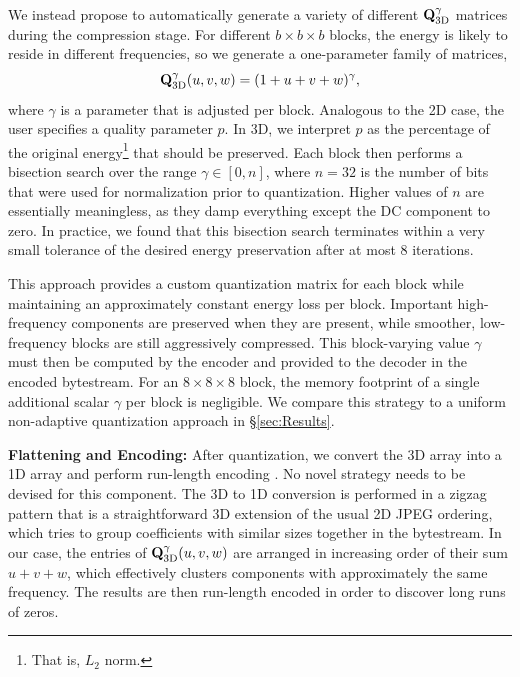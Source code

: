 We instead propose to automatically generate a variety of different $\mathbf{Q}^{\gamma}_{\textrm{3D}}$ matrices during the compression stage. For different $b \times b \times b$ blocks, the energy is likely to reside in different frequencies, so we generate a one-parameter family of matrices,
\begin{equation}
\mathbf{Q}^{\gamma}_{\textrm{3D}}(u,v,w) = (1 + u + v + w)^\gamma,
\end{equation}
where $\gamma$ is a parameter that is adjusted per block. 
Analogous to the 2D case, the user specifies a quality parameter $p$. In 3D, we interpret $p$ as the percentage of the original energy\footnote{That is, $L_2$ norm.} that should be preserved. Each block then performs a bisection search over the range $\gamma \in [0, n]$, where $n = 32$ is the number of bits that were used for normalization prior to quantization. Higher values of $n$ are essentially meaningless, as they damp everything except the DC component to zero. In practice, we found that this bisection search terminates within a very small tolerance of the desired energy preservation after at most $8$ iterations.

This approach provides a custom quantization matrix for each block while maintaining an approximately constant energy loss per block. Important high-frequency components are preserved when they are present, while smoother, low-frequency blocks are still aggressively compressed. This block-varying value $\gamma$ must then be computed by the encoder and provided to the decoder in the encoded bytestream. For an $8 \times 8 \times 8$ block, the memory footprint of a single additional scalar $\gamma$ per block is negligible. We compare this strategy to a uniform non-adaptive quantization approach in \S\ref{sec:Results}.

\noindent \textbf{Flattening and Encoding:} After quantization, we convert the 3D array into a 1D array and perform run-length encoding \cite{Yeo:1995:VRD,Sayood:2012:JPEG}. No novel strategy needs to be devised for this component. The 3D to 1D conversion is performed in a zigzag pattern that is a straightforward 3D extension of the usual 2D JPEG ordering, which tries to group coefficients with similar sizes together in the bytestream.  In our case, the entries of $\mathbf{Q}^{\gamma}_{\textrm{3D}}(u,v,w)$ are arranged in increasing order of their sum $u + v + w$, which effectively clusters components with approximately the same frequency. The results are then run-length encoded in order to discover long runs of zeros.

